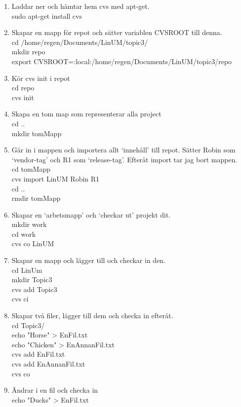 \documentclass[11pt]{article}
\begin{document}
\begin{enumerate}
\item Laddar ner och hämtar hem cvs med apt-get. \\
sudo apt-get install cvs
\item Skapar en mapp för repot och sätter variablen CVSROOT till denna.\\
cd /home/regen/Documents/LinUM/topic3/ \\
mkdir repo \\
export CVSROOT=:local:/home/regen/Documents/LinUM/topic3/repo
\item Kör cvs init i repot\\
cd repo\\
cvs init
\item Skapa en tom map som representerar alla project \\
cd ..\\
mkdir tomMapp
\item Går in i mappen och importera allt `innehåll' till repot. Sätter Robin som `vendor-tag' och R1 som `release-tag'. Efteråt import tar jag bort mappen.\\
cd tomMapp\\
cvs import LinUM Robin R1\\
cd ..\\
rmdir tomMapp
\item Skapar en `arbetsmapp' och `checkar ut' projekt dit.\\
mkdir work\\
cd work\\
cvs co LinUM
\item Skapar en mapp och lägger till och checkar in den.\\
cd LinUm\\
mkdir Topic3\\
cvs add Topic3\\
cvs ci\\
\item Skapar två filer, lägger till dem och checka in efteråt. \\
cd Topic3/\\
echo "Horse" > EnFil.txt\\
echo "Chicken" > EnAnnanFil.txt\\
cvs add EnFil.txt \\
cvs add EnAnnanFil.txt \\
cvs co
\item Ändrar i en fil och checka in\\
echo "Ducks" > EnFil.txt
\end{enumerate}
\end{document}
